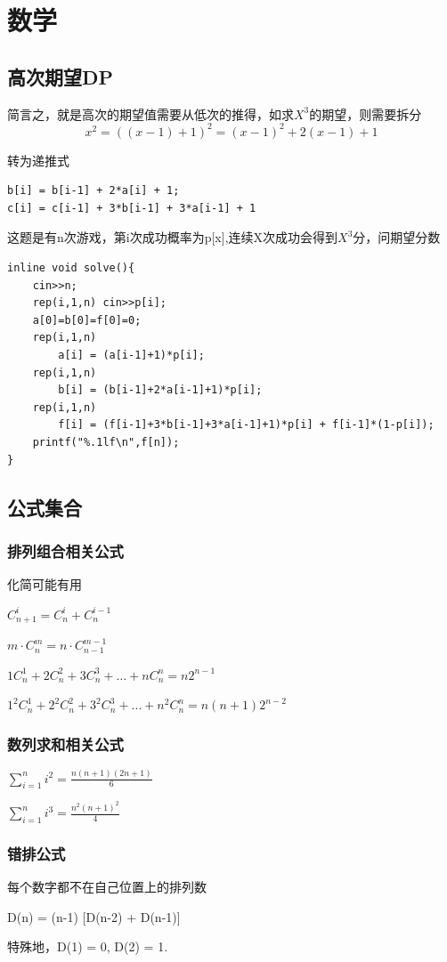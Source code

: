 \documentclass[a4]{ctexart}
\begin{document}
\section{数学}
\subsection{高次期望DP}

简言之，就是高次的期望值需要从低次的推得，如求$X^3$的期望，则需要拆分
$$x^2 = ((x-1) + 1)^2 = (x-1)^2 + 2(x-1) + 1$$\par
转为递推式
\begin{lstlisting}
b[i] = b[i-1] + 2*a[i] + 1;
c[i] = c[i-1] + 3*b[i-1] + 3*a[i-1] + 1
\end{lstlisting}
\par
这题是有n次游戏，第i次成功概率为p[x],连续X次成功会得到$X^3$分，问期望分数\\
\begin{lstlisting}
inline void solve(){
    cin>>n;
    rep(i,1,n) cin>>p[i];
    a[0]=b[0]=f[0]=0;
    rep(i,1,n)
        a[i] = (a[i-1]+1)*p[i];
    rep(i,1,n)
        b[i] = (b[i-1]+2*a[i-1]+1)*p[i];
    rep(i,1,n)
        f[i] = (f[i-1]+3*b[i-1]+3*a[i-1]+1)*p[i] + f[i-1]*(1-p[i]);
    printf("%.1lf\n",f[n]);
}
\end{lstlisting}
\newpage
\subsection{公式集合}
\subsubsection{排列组合相关公式}
化简可能有用\par
$C_{n+1}^i = C_n^i + C_n^{i-1}$\par
$m\cdot C_n^m = n\cdot C_{n-1}^{m-1}$\par
$1C_n^1+2C_n^2+3C_n^3+\dots + nC_n^n = n2^{n-1}$\par
$1^2C_n^1+2^2C_n^2+3^2C_n^3+\dots + n^2C_n^n = n(n+1)2^{n-2}$

\subsubsection{数列求和相关公式}
$\sum_{i=1}^{n} i^2 = \frac{n(n+1)(2n+1)}{6}$\par
$\sum_{i=1}^{n} i^3 = \frac{n^2(n+1)^2}{4}$

\subsubsection{错排公式}
每个数字都不在自己位置上的排列数\par
D(n) = (n-1) [D(n-2) + D(n-1)]\par
特殊地，D(1) = 0, D(2) = 1.
\end{document}
